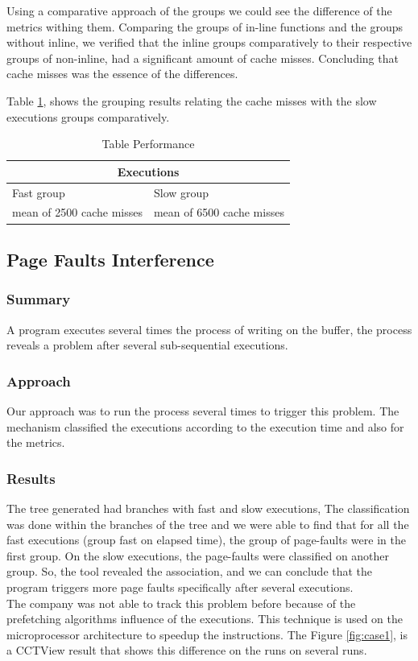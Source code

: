     Using a comparative approach of the groups we could see the difference of the metrics withing them. Comparing the groups of in-line functions and the groups without inline, we verified that the inline groups comparatively to their respective groups of non-inline, had a significant amount of cache misses. Concluding that cache misses was the essence of the differences.
    
    Table \ref{tab:table}, shows the grouping results relating the cache misses with the slow executions groups comparatively. 
    
\begin{table}[]
\centering
\caption{Table Performance}
\label{tab:table}
\begin{tabular}{ll}
\hline
\multicolumn{2}{c}{Executions}                        \\ \hline
Fast group                & Slow group                \\ \hline
mean of 2500 cache misses & mean of 6500 cache misses
\end{tabular}
\end{table}

\subsection{Page Faults Interference}
    \subsubsection{Summary}
    A program executes several times the process of writing on the buffer, the process reveals a problem after several sub-sequential executions.
    
\subsubsection{Approach}
    Our approach was to run the process several times to trigger this problem. The mechanism classified the executions according to the execution time and also for the metrics.
    
\subsubsection{Results}
     The tree generated had branches with fast and slow executions, 
     The classification was done within the branches of the tree and we were able to find that for all the fast executions (group fast on elapsed time), the group of page-faults were in the first group. On the slow executions, the page-faults were classified on another group. So, the tool revealed the association, and we can conclude that the program triggers more page faults specifically after several executions.\\
     The company was not able to track this problem before because of the prefetching algorithms influence of the executions. This technique is used on the microprocessor architecture to speedup the instructions. The Figure \ref{fig:case1}, is a CCTView result that shows this  difference on the runs on several runs.
    
